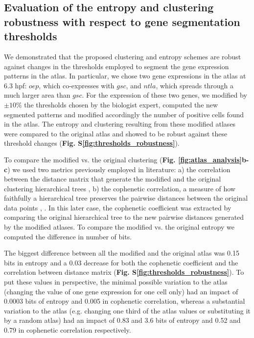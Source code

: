 \subsection*{Evaluation of the entropy and clustering robustness with respect to gene segmentation thresholds}

\label{sec:evaluationEntropyClustering}



We demonstrated that the proposed clustering and entropy schemes are robust against changes in the thresholds employed to segment the gene expression patterns in the atlas. In particular, we chose two gene expressions in the atlas at 6.3 hpf: $oep$, which co-expresses with $gsc$, and $ntla$, which spreads through a much larger area than $gsc$. For the expression of these two genes, we modified by $\pm10\%$ the thresholds chosen by the biologist expert, computed the new segmented patterns and modified accordingly the number of positive cells found in the atlas. The entropy and clustering resulting from these modified atlases were compared to the original atlas and showed to be robust against these threshold changes (\textbf{Fig. S\ref{fig:thresholds_robustness}}).

To compare the modified vs. the original clustering (\textbf{Fig. \ref{fig:atlas_analysis}b-c}) we used two metrics previously employed in literature: a) the correlation between the distance matrix that generate the modified and the original clustering hierarchical trees \cite{duncan1980comparison}, b) the cophenetic correlation, a measure of how faithfully a hierarchical tree preserves the pairwise distances between the original data points \cite{sokal1962the}, \cite{saracli2013comparison}. In this later case, the cophenetic coefficient was extracted by comparing the original hierarchical tree to the new pairwise distances generated by the modified atlases. To compare the modified vs. the original entropy we computed the difference in number of bits.

The biggest difference between all the modified and the original atlas was 0.15 bits in entropy and a 0.03 decrease for both the cophenetic coefficient and the correlation between distance matrix (\textbf{Fig. S\ref{fig:thresholds_robustness}}). To put these values in perspective, the minimal possible variation to the atlas (changing the value of one gene expression for one cell only) had an impact of 0.0003 bits of entropy and 0.005 in cophenetic correlation, whereas a substantial variation to the atlas (e.g. changing one third of the atlas values or substituting it by a random atlas) had an impact of 0.83 and 3.6 bits of entropy and 0.52 and 0.79 in cophenetic correlation respectively.



